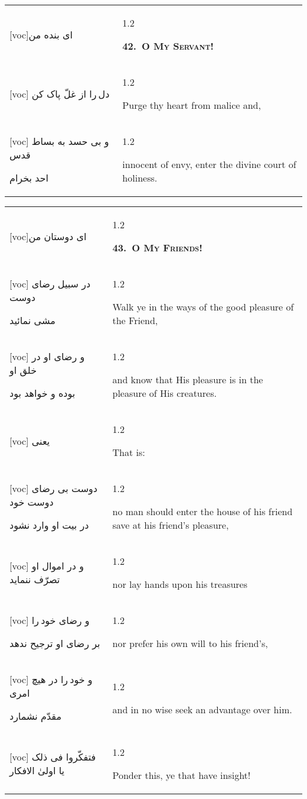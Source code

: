 \documentclass[11pt]{article}
\makeatletter
\newenvironment{orig}
  {\begin{farsi}[voc]}
  {\end{farsi}}
\newenvironment{trans}
  {\Large\begin{spacing}{1.2}\raggedright}
  {\end{spacing}}
\newenvironment{word}
  {\begin{tabular}[t]{p{2.75in}@{\hspace{3em}}p{2.875in}}}
  {\end{tabular}}
\newcommand{\ayat}[2]{\begin{orig}#1\end{orig} & \begin{trans}#2\end{trans}}
\newcommand{\heading}[2]{\textsc{\textbf{#1}} %
}
\makeatother
\begin{document}
\pagebreak

\begin{word}
\ayat{ای بنده من}{\heading{42.~O My Servant!}{}} \\ \ayat{
دل را از غلّ پاک کن
}{Purge thy heart from malice and,} \vspace{-1ex}\\ \ayat{
و بی حسد به بساط قدس

احد بخرام
}{innocent of envy, enter the divine court of holiness.}
\end{word}

\pagebreak

\begin{word}
\ayat{ای دوستان من}{\heading{43.~O My Friends!}{}} \\ \ayat{
در سبيل رضای دوست

مشی نمائيد
}{Walk ye in the ways of the good pleasure of the Friend,} \vspace{-1ex}\\ \ayat{
و رضای او در خلق او

بوده و خواهد بود
}{and know that His pleasure is in the pleasure of His creatures.} \vspace{-1ex}\\ \ayat{
يعنی
}{That is:} \vspace{-1ex}\\ \ayat{
دوست بی رضای دوست خود

در بيت او وارد نشود
}{no man should enter the house of his friend save at his friend's
  pleasure,} \\ \ayat{
و در اموال او تصرّف ننمايد
}{nor lay hands upon his treasures} \vspace{-1ex}\\ \ayat{
و رضای خود را

بر رضای او ترجيح ندهد
}{nor prefer his own will to his friend's,} \\ \ayat{
و خود را در هيچ امری

مقدّم نشمارد
}{and in no wise seek an advantage over him.} \\ \ayat{
فتفکّروا فی ذلک يا اولیٰ الافکار
}{Ponder this, ye that have insight!}
\end{word}

\pagebreak

\end{document}
